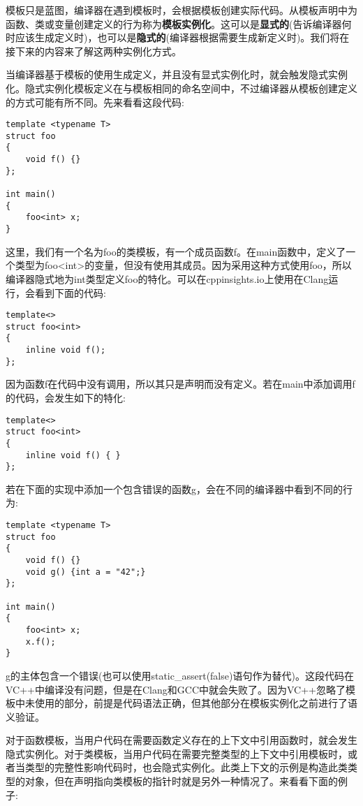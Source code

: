 
模板只是蓝图，编译器在遇到模板时，会根据模板创建实际代码。从模板声明中为函数、类或变量创建定义的行为称为\textbf{模板实例化}。这可以是\textbf{显式的}(告诉编译器何时应该生成定义时)，也可以是\textbf{隐式的}(编译器根据需要生成新定义时)。我们将在接下来的内容来了解这两种实例化方式。


当编译器基于模板的使用生成定义，并且没有显式实例化时，就会触发隐式实例化。隐式实例化模板定义在与模板相同的命名空间中，不过编译器从模板创建定义的方式可能有所不同。先来看看这段代码:

\begin{lstlisting}[style=styleCXX]
template <typename T>
struct foo
{
	void f() {}
};

int main()
{
	foo<int> x;
}
\end{lstlisting}

这里，我们有一个名为foo的类模板，有一个成员函数f。在main函数中，定义了一个类型为foo<int>的变量，但没有使用其成员。因为采用这种方式使用foo，所以编译器隐式地为int类型定义foo的特化。可以在cppinsights.io上使用在Clang运行，会看到下面的代码:

\begin{lstlisting}[style=styleCXX]
template<>
struct foo<int>
{
	inline void f();
};
\end{lstlisting}

因为函数f在代码中没有调用，所以其只是声明而没有定义。若在main中添加调用f的代码，会发生如下的特化:

\begin{lstlisting}[style=styleCXX]
template<>
struct foo<int>
{
	inline void f() { }
};
\end{lstlisting}

若在下面的实现中添加一个包含错误的函数g，会在不同的编译器中看到不同的行为:

\begin{lstlisting}[style=styleCXX]
template <typename T>
struct foo
{
	void f() {}
	void g() {int a = "42";}
};

int main()
{
	foo<int> x;
	x.f();
}
\end{lstlisting}

g的主体包含一个错误(也可以使用static\_assert(false)语句作为替代)。这段代码在VC++中编译没有问题，但是在Clang和GCC中就会失败了。因为VC++忽略了模板中未使用的部分，前提是代码语法正确，但其他部分在模板实例化之前进行了语义验证。


对于函数模板，当用户代码在需要函数定义存在的上下文中引用函数时，就会发生隐式实例化。对于类模板，当用户代码在需要完整类型的上下文中引用模板时，或者当类型的完整性影响代码时，也会隐式实例化。此类上下文的示例是构造此类类型的对象，但在声明指向类模板的指针时就是另外一种情况了。来看看下面的例子:

